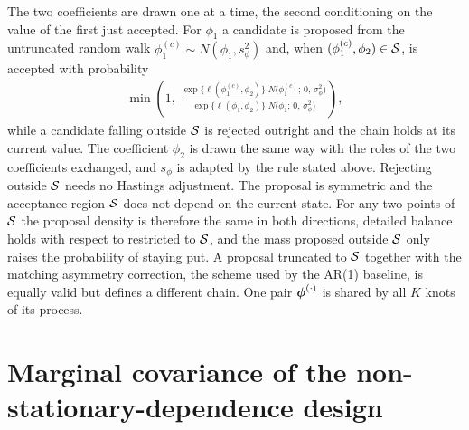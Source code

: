 \documentclass[12pt]{article}
\begin{document}
The two coefficients are drawn one at a time, the second conditioning on the value of the first just accepted.  For $\phi_1$ a candidate is proposed from the untruncated random walk $\phi_1^{(c)} \sim N(\phi_1, s_\phi^2)$ and, when $(\phi_1^{(c)}, \phi_2) \in {\cal S}$, is accepted with probability
\begin{align}
  \min\!\left(1,\;
    \frac{\exp\{\ell(\phi_1^{(c)}, \phi_2)\}\; N\big(\phi_1^{(c)};\, 0,\, \sigma^2_\phi\big)}
         {\exp\{\ell(\phi_1, \phi_2)\}\; N\big(\phi_1;\, 0,\, \sigma^2_\phi\big)}\right),
  \label{eq:phi-mh-ratio}
\end{align}
while a candidate falling outside ${\cal S}$ is rejected outright and the chain holds at its current value.  The coefficient $\phi_2$ is drawn the same way with the roles of the two coefficients exchanged, and $s_\phi$ is adapted by the rule stated above.  Rejecting outside ${\cal S}$ needs no Hastings adjustment.  The proposal is symmetric and the acceptance region ${\cal S}$ does not depend on the current state.  For any two points of ${\cal S}$ the
proposal density is therefore the same in both directions, detailed balance holds with respect to  restricted to ${\cal S}$, and the mass proposed outside ${\cal S}$ only raises the probability of staying put.  A proposal truncated to ${\cal S}$ together with the matching asymmetry correction, the scheme used by the AR(1) baseline, is equally valid but defines a different chain.  One pair $\mbox{\boldmath $\phi$}^{(\cdot)}$ is shared by all $K$ knots of its process.

\section{Marginal covariance of the non-stationary-dependence design}\label{app:nsdep-cov}
\end{document}
